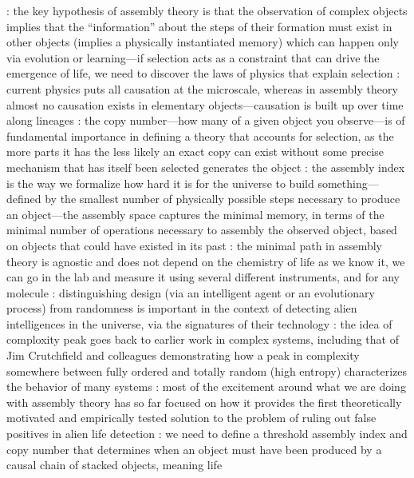 : the key hypothesis of assembly theory is that the observation of complex objects implies that the “information” about the steps of their formation must exist in other objects (implies a physically instantiated memory) which can happen only via evolution or learning—if selection acts as a constraint that can drive the emergence of life, we need to discover the laws of physics that explain selection\markdownRendererUlItemEnd 
{}: current physics puts all causation at the microscale, whereas in assembly theory almost no causation exists in elementary objects—causation is built up over time along lineages\markdownRendererUlItemEnd 
{}: the copy number—how many of a given object you observe—is of fundamental importance in defining a theory that accounts for selection, as the more parts it has the less likely an exact copy can exist without some precise mechanism that has itself been selected generates the object\markdownRendererUlItemEnd 
{}: the assembly index is the way we formalize how hard it is for the universe to build something—defined by the smallest number of physically possible steps necessary to produce an object—the assembly space captures the minimal memory, in terms of the minimal number of operations necessary to assembly the observed object, based on objects that could have existed in its past\markdownRendererUlItemEnd 
{}: the minimal path in assembly theory is agnostic and does not depend on the chemistry of life as we know it, we can go in the lab and measure it using several different instruments, and for any molecule\markdownRendererUlItemEnd 
{}: distinguishing design (via an intelligent agent or an evolutionary process) from randomness is important in the context of detecting alien intelligences in the universe, via the signatures of their technology\markdownRendererUlItemEnd 
{}: the idea of comploxity peak goes back to earlier work in complex systems, including that of Jim Crutchfield and colleagues demonstrating how a peak in complexity somewhere between fully ordered and totally random (high entropy) characterizes the behavior of many systems\markdownRendererUlItemEnd 
{}: most of the excitement around what we are doing with assembly theory has so far focused on how it provides the first theoretically motivated and empirically tested solution to the problem of ruling out false positives in alien life detection\markdownRendererUlItemEnd 
{}: we need to define a threshold assembly index and copy number that determines when an object must have been produced by a causal chain of stacked objects, meaning life\markdownRendererUlItemEnd 
